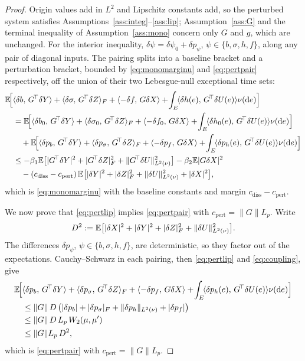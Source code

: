 \begin{proof}
Origin values add in $L^2$ and Lipschitz constants add, so the perturbed system satisfies
Assumptions~\ref{ass:integ}--\ref{ass:lip}; Assumption~\ref{ass:G} and the terminal
inequality of Assumption~\ref{ass:mono} concern only $G$ and $g$, which are unchanged.
For the interior inequality, $\delta\psi=\delta\psi_0+\delta p_\psi$,
$\psi\in\{b,\sigma,h,f\}$, along any pair of diagonal inputs.
The pairing splits into a baseline bracket and a perturbation bracket, bounded by
\eqref{eq:monomarginu} and \eqref{eq:pertpair} respectively, off the union of their two
Lebesgue-null exceptional time sets:
\[
\begin{aligned}
&\E\!\Big[\inner{\delta b}{\Gstar\delta Y}+\inner{\delta\sigma}{\Gstar\delta Z}_F
+\inner{-\delta f}{G\delta X}+\!\int_E\!\inner{\delta h(e)}{\Gstar\delta U(e)}\nu(\diff e)\Big]\\
&\quad=\E\!\Big[\inner{\delta b_0}{\Gstar\delta Y}+\inner{\delta\sigma_0}{\Gstar\delta Z}_F
+\inner{-\delta f_0}{G\delta X}+\!\int_E\!\inner{\delta h_0(e)}{\Gstar\delta U(e)}\nu(\diff e)\Big]\\
&\qquad+\E\!\Big[\inner{\delta p_b}{\Gstar\delta Y}+\inner{\delta p_\sigma}{\Gstar\delta Z}_F
+\inner{-\delta p_f}{G\delta X}+\!\int_E\!\inner{\delta p_h(e)}{\Gstar\delta U(e)}\nu(\diff e)\Big]\\
&\quad\le-\beta_1\E\big[|\Gstar\delta Y|^2+|\Gstar\delta Z|_F^2+\Lnorm{\Gstar\delta U}^2\big]-\beta_2\E|G\delta X|^2\\
&\qquad-(c_{\mathrm{diss}}-c_{\mathrm{pert}})\,\E\big[|\delta Y|^2+|\delta Z|_F^2+\Lnorm{\delta U}^2+|\delta X|^2\big] ,
\end{aligned}
\]
which is \eqref{eq:monomarginu} with the baseline constants and margin
$c_{\mathrm{diss}}-c_{\mathrm{pert}}$.

We now prove that \eqref{eq:pertlip} implies \eqref{eq:pertpair} with
$c_{\mathrm{pert}}=\|G\|L_p$. Write
\[
D^2:=\mathbb{E}\big[|\delta X|^2+|\delta Y|^2+|\delta Z|_F^2+\lVert \delta U\rVert_{L^2(\nu)}^2\big].
\]
The differences $\delta p_\psi$,
$\psi\in\{b,\sigma,h,f\}$, are deterministic, so they factor out of the expectations.
Cauchy--Schwarz in each pairing, then \eqref{eq:pertlip} and \eqref{eq:coupling}, give
\[
\begin{aligned}
&\mathbb{E}\!\Big[\langle \delta p_b,\,G^{\!\top}\delta Y\rangle+\langle \delta p_\sigma,\,G^{\!\top}\delta Z\rangle_F
+\langle -\delta p_f,\,G\delta X\rangle+\!\int_E\!\langle \delta p_h(e),\,G^{\!\top}\delta U(e)\rangle\nu(\mathrm{d} e)\Big]\\
&\quad\le\|G\|\,D\,\bigl(|\delta p_b|+|\delta p_\sigma|_F+\lVert \delta p_h\rVert_{L^2(\nu)}+|\delta p_f|\bigr)\\
&\quad\le\|G\|\,D\,L_p\,W_2(\mu,\mu')\\
&\quad\le\|G\|L_p\,D^2 ,
\end{aligned}
\]
which is \eqref{eq:pertpair} with $c_{\mathrm{pert}}=\|G\|L_p$.
\end{proof}
